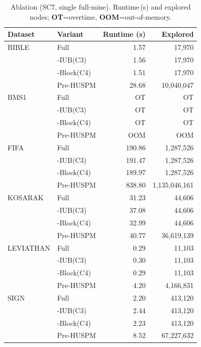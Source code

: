 \begin{table}[t]
\centering
\caption{Ablation (SC7, single full-mine). Runtime\,(s) and explored nodes; \textbf{OT}=overtime, \textbf{OOM}=out-of-memory.}
\label{tab:sc7_ablation}
\begin{tabular}{llrr}
\toprule
Dataset & Variant & Runtime (s) & Explored \\
\midrule
BIBLE & Full & 1.57 & 17,970 \\
 & -IUB(C3) & 1.56 & 17,970 \\
 & -Block(C4) & 1.51 & 17,970 \\
 & Pre-HUSPM & 28.68 & 10,040,047 \\
BMS1 & Full & OT & OT \\
 & -IUB(C3) & OT & OT \\
 & -Block(C4) & OT & OT \\
 & Pre-HUSPM & OOM & OOM \\
FIFA & Full & 190.86 & 1,287,526 \\
 & -IUB(C3) & 191.47 & 1,287,526 \\
 & -Block(C4) & 189.97 & 1,287,526 \\
 & Pre-HUSPM & 838.80 & 1,135,046,161 \\
KOSARAK & Full & 31.23 & 44,606 \\
 & -IUB(C3) & 37.08 & 44,606 \\
 & -Block(C4) & 32.99 & 44,606 \\
 & Pre-HUSPM & 40.77 & 36,619,139 \\
LEVIATHAN & Full & 0.29 & 11,103 \\
 & -IUB(C3) & 0.30 & 11,103 \\
 & -Block(C4) & 0.29 & 11,103 \\
 & Pre-HUSPM & 4.20 & 4,166,831 \\
SIGN & Full & 2.20 & 413,120 \\
 & -IUB(C3) & 2.44 & 413,120 \\
 & -Block(C4) & 2.23 & 413,120 \\
 & Pre-HUSPM & 8.52 & 67,227,632 \\
\bottomrule
\end{tabular}
\end{table}
